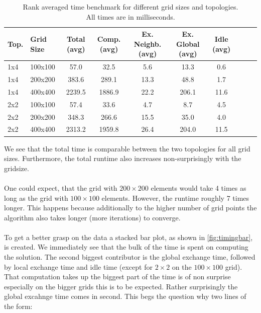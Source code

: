 \begin{table}[H]
    \centering
    \begin{tabular}{|l|l|c|c|c|c|c|c|c|c|}
        \hline
        Top. & Grid Size & Total (avg) & Comp. (avg) & Ex. Neighb. (avg) & Ex. Global (avg) & Idle (avg) \\\hline
        1x4 & 100x100 & 57.0 & 32.5 & 5.6 & 13.3 & 0.6 \\\hline
        1x4 & 200x200 & 383.6 & 289.1 & 13.3 & 48.8 & 1.7 \\\hline
        1x4 & 400x400 & 2239.5 & 1886.9 & 22.2 & 206.1 & 11.6 \\\hline
        2x2 & 100x100 & 57.4 & 33.6 & 4.7 & 8.7 & 4.5 \\\hline
        2x2 & 200x200 & 348.3 & 266.6 & 15.5 & 35.0 & 4.0 \\\hline
        2x2 & 400x400 & 2313.2 & 1959.8 & 26.4 & 204.0 & 11.5 \\\hline
    \end{tabular}
    \caption{Rank averaged time benchmark for different grid sizes and topologies.\\ All times are in milliseconds.}
    \label{tab:timing}
\end{table}
We see that the total time is comparable between the two topologies for all grid sizes. Furthermore, the total runtime also increases non-surprisingly with the gridsize. \\
\\
One could expect, that the grid with $200\times200$ elements would take 4 times as long as the grid with $100\times100$ elements. However, the runtime roughly 7 times longer. This happens because additionally to the higher number of grid points the algorithm also takes longer (more iterations) to converge. \\
\\
To get a better grasp on the data a stacked bar plot, as shown in \autoref{fig:timingbar}, is created. We immediately see that the bulk of the time is spent on computing the solution. The second biggest contributor is the global exchange time, followed by local exchange time and idle time (except for $2\times2$ on the $100\times100$ grid).\\
That computation takes up the biggest part of the time is of non surprise especially on the bigger grids this is to be expected. Rather surprisingly the global excahnge time comes in second. This begs the question why two lines of the form:
